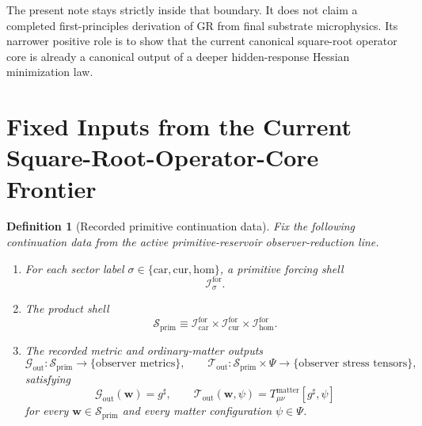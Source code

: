\documentclass[11pt]{article}
\newcommand{\CompletedMetric}{g^{\sharp}}
\newcommand{\MatterSpace}{\Psi}
\newcommand{\Car}{\mathrm{car}}
\newcommand{\Cur}{\mathrm{cur}}
\newcommand{\Hom}{\mathrm{hom}}
\newcommand{\ForSpace}[1]{\mathcal I_{#1}^{\mathrm{for}}}
\newcommand{\PrimShell}{\mathcal S_{\mathrm{prim}}}
\newcommand{\MetricOut}{\mathscr G_{\mathrm{out}}}
\newcommand{\MatterOut}{\mathscr T_{\mathrm{out}}}
\newtheorem{definition}{Definition}
\begin{document}
The present note stays strictly inside that boundary. It does not claim a completed first-principles derivation of GR from final substrate microphysics. Its narrower positive role is to show that the current canonical square-root operator core is already a canonical output of a deeper hidden-response Hessian minimization law.

\section{Fixed Inputs from the Current Square-Root-Operator-Core Frontier}

\begin{definition}[Recorded primitive continuation data]
\label{def:fixed}
Fix the following continuation data from the active primitive-reservoir observer-reduction line.
\begin{enumerate}
    \item For each sector label \(\sigma\in\{\Car,\Cur,\Hom\}\), a primitive forcing shell
    \[
    \ForSpace{\sigma}.
    \]
    \item The product shell
    \[
    \PrimShell
    \equiv
    \ForSpace{\Car}\times \ForSpace{\Cur}\times \ForSpace{\Hom}.
    \]
    \item The recorded metric and ordinary-matter outputs
    \[
    \MetricOut:\PrimShell\to\{\text{observer metrics}\},
    \qquad
    \MatterOut:\PrimShell\times\MatterSpace\to\{\text{observer stress tensors}\},
    \]
    satisfying
    \begin{equation}
    \MetricOut(\mathbf w)=\CompletedMetric,
    \qquad
    \MatterOut(\mathbf w,\psi)
    =
    T_{\mu\nu}^{\mathrm{matter}}[\CompletedMetric,\psi]
    \label{eq:fixedoutputs}
    \end{equation}
    for every \(\mathbf w\in\PrimShell\) and every matter configuration \(\psi\in\MatterSpace\).
\end{enumerate}
\end{definition}
\end{document}
